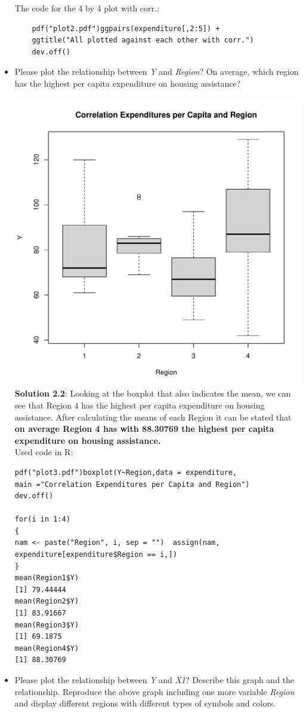 \documentclass[12pt,letterpaper]{article}
\begin{document}
\begin{itemize}
The code for the 4 by 4 plot with corr.:
\begin{verbatim}
	pdf("plot2.pdf")ggpairs(expenditure[,2:5]) +  
	ggtitle("All plotted against each other with corr.")
	dev.off()
\end{verbatim}

\item
Please plot the relationship between \emph{Y} and \emph{Region}? On average, which region has the highest per capita expenditure on housing assistance?
\vspace{.5cm}

\includegraphics[width=.50\textwidth]{plot3.pdf} \\

\textbf{Solution 2.2}: Looking at the boxplot that also indicates the mean, we can see that Region 4 has the highest per capita expenditure on housing assistance. After calculating the means of each Region it can be stated that \textbf{on average Region 4 has with 88.30769 the highest per capita expenditure on housing assistance.}
\\
Used code in R:
\begin{verbatim}
pdf("plot3.pdf")boxplot(Y~Region,data = expenditure, 
main ="Correlation Expenditures per Capita and Region")
dev.off()
	
for(i in 1:4) 
{   
nam <- paste("Region", i, sep = "")  assign(nam, 
expenditure[expenditure$Region == i,])
}
mean(Region1$Y)
[1] 79.44444 
mean(Region2$Y)
[1] 83.91667
mean(Region3$Y)
[1] 69.1875
mean(Region4$Y)
[1] 88.30769
\end{verbatim}

\item
Please plot the relationship between \emph{Y} and \emph{X1}? Describe this graph and the relationship. Reproduce the above graph including one more variable \emph{Region} and display different regions with different types of symbols and colors.
\end{itemize}
\end{document}
